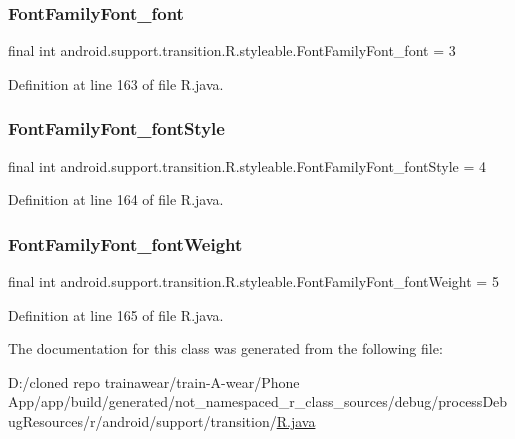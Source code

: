 \subsubsection{\texorpdfstring{FontFamilyFont\_font}{FontFamilyFont\_font}}
{\footnotesize\ttfamily final int android.\+support.\+transition.\+R.\+styleable.\+Font\+Family\+Font\+\_\+font = 3\hspace{0.3cm}{\ttfamily [static]}}



Definition at line 163 of file R.\+java.

\mbox{\label{classandroid_1_1support_1_1transition_1_1_r_1_1styleable_aa596a29b204cadfcf4894041bb877a46}} 
\subsubsection{\texorpdfstring{FontFamilyFont\_fontStyle}{FontFamilyFont\_fontStyle}}
{\footnotesize\ttfamily final int android.\+support.\+transition.\+R.\+styleable.\+Font\+Family\+Font\+\_\+font\+Style = 4\hspace{0.3cm}{\ttfamily [static]}}



Definition at line 164 of file R.\+java.

\mbox{\label{classandroid_1_1support_1_1transition_1_1_r_1_1styleable_ac169fcd6c0a602cbbc9306606e16ab9a}} 
\subsubsection{\texorpdfstring{FontFamilyFont\_fontWeight}{FontFamilyFont\_fontWeight}}
{\footnotesize\ttfamily final int android.\+support.\+transition.\+R.\+styleable.\+Font\+Family\+Font\+\_\+font\+Weight = 5\hspace{0.3cm}{\ttfamily [static]}}



Definition at line 165 of file R.\+java.



The documentation for this class was generated from the following file\+:\begin{DoxyCompactItemize}
\item 
D\+:/cloned repo trainawear/train-\/\+A-\/wear/\+Phone App/app/build/generated/not\+\_\+namespaced\+\_\+r\+\_\+class\+\_\+sources/debug/process\+Debug\+Resources/r/android/support/transition/\mbox{\hyperlink{process_debug_resources_2r_2android_2support_2transition_2_r_8java}{R.\+java}}\end{DoxyCompactItemize}
